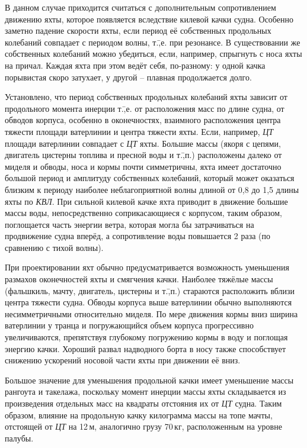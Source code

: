 В данном случае приходится считаться с дополнительным сопротивлением
движению яхты, которое появляется вследствие килевой качки
судна. Особенно заметно падение скорости яхты, если период её
собственных продольных колебаний совпадает с периодом волны,
т.\=,е. при резонансе. В существовании же собственных колебаний можно
убедиться, если, например, спрыгнуть с носа яхты на причал. Каждая
яхта при этом ведёт себя, по-разному: у одной качка порывистая скоро
затухает, у другой \--- плавная продолжается долго.

Установлено, что период собственных продольных колебаний яхты зависит
от продольного момента инерции т.\=,е. от расположения масс по длине
судна, от обводов корпуса, особенно в оконечностях, взаимного
расположения центра тяжести площади ватерлинии и центра тяжести
яхты. Если, например, \textit{ЦТ} площади ватерлинии совпадает с
\textit{ЦТ} яхты. Большие массы (якоря с цепями, двигатель цистерны
топлива и пресной воды и т.\=,п.) расположены далеко от миделя и
обводы, носа и кормы почти симметричны, яхта имеет достаточно большой
период и амплитуду собственных колебаний, который может оказаться
близким к периоду наиболее неблагоприятной волны длиной от 0,8 до 1,5
длины яхты по \textit{КВЛ}. При сильной килевой качке яхта приводит в
движение большие массы воды, непосредственно соприкасающиеся с
корпусом, таким образом, поглощается часть энергии ветра, которая
могла бы затрачиваться на продвижение судна вперёд, а сопротивление
воды повышается 2 раза (по сравнению с тихой волны).

При проектировании яхт обычно предусматривается возможность уменьшения
размахов оконечностей яхты и смягчения качки. Наиболее тяжёлые массы
(фальшкиль, мачту, двигатель, цистерны и т.\=,п.) стараются
расположить вблизи центра тяжести судна. Обводы корпуса выше
ватерлинии обычно выполняются несимметричными относительно миделя. По
мере движения кормы вниз ширина ватерлинии у транца и погружающийся
объем корпуса прогрессивно увеличиваются, препятствуя глубокому
погружению кормы в воду и поглощая энергию качки. Хороший развал
надводного борта в носу также способствует снижению ускорений носовой
части яхты при движении её вниз.
 
Большое значение для уменьшения продольной качки имеет уменьшение
массы рангоута и такелажа, поскольку момент инерции массы яхты
складывается из произведения отдельных масс на квадраты отстояния их
от \textit{ЦТ} судна. Таким образом, влияние на продольную качку
килограмма массы на топе мачты, отстоящей от \textit{ЦТ} на 12\,м,
аналогично грузу 70\,кг, расположенным на уровне палубы.

